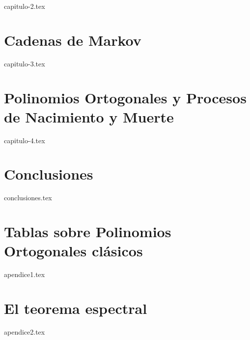 \documentclass[twoside,openright,11pt]{report}
\begin{document}
{capitulo-2.tex}

\chapter{Cadenas de Markov}
\label{chap:Markov}

{capitulo-3.tex}

\chapter{Polinomios Ortogonales y Procesos de Nacimiento y Muerte}
\label{chap:POyPNM}

{capitulo-4.tex}

\chapter*{Conclusiones}
\label{chap:conclusiones}

{conclusiones.tex}

\nocite{*}
%
\printbibliography


\appendix
\cleardoublepage
{}


\chapter{Tablas sobre Polinomios Ortogonales clásicos}
\label{appendix:tablas}

{apendice1.tex}

\chapter{El teorema espectral}
\label{appendix:teorema-espectral}

{apendice2.tex}
\end{document}
